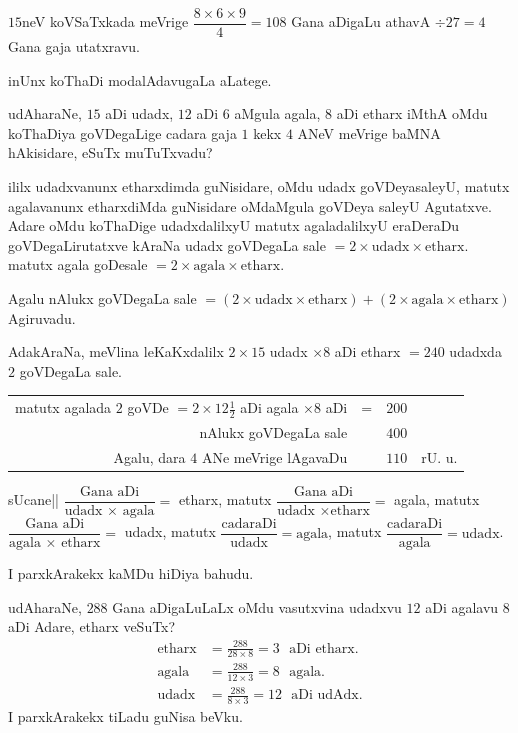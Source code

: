 $15$neV koVSaTxkada meVrige $\dfrac{8\times 6\times 9}{4}=108$ Gana
aDigaLu athavA $\div 27=4$ Gana gaja utatxravu.

inUnx koThaDi modalAdavugaLa aLatege.

udAharaNe, $15$ aDi udadx, $12$ aDi $6$ aMgula agala, $8$ aDi etharx
iMthA oMdu koThaDiya goVDegaLige cadara gaja $1$ kekx $4$ ANeV meVrige
baMNA hAkisidare, eSuTx muTuTxvadu?

ililx udadxvanunx etharxdimda guNisidare, oMdu udadx goVDeyasaleyU,
matutx agalavanunx etharxdiMda guNisidare oMdaMgula goVDeya saleyU
Agutatxve. Adare oMdu koThaDige udadxdalilxyU matutx agaladalilxyU
eraDeraDu goVDegaLirutatxve kAraNa udadx goVDegaLa sale
$=2\times\text{udadx}\times \text{etharx}$. matutx agala goDesale $=2\times
\text{agala}\times \text{etharx}$.

Agalu nAlukx goVDegaLa sale $=(2\times\text{udadx}\times
\text{etharx})+(2\times \text{agala}\times \text{etharx})$ Agiruvadu.

AdakAraNa, meVlina leKaKxdalilx $2\times 15$ udadx $\times 8$ aDi
etharx $=240$ udadxda $2$ goVDegaLa sale.
\begin{center}
\begin{tabular}{rcll}
matutx agalada $2$ goVDe $=2\times 12\frac{1}{2}$ aDi agala $\times 8$
aDi & = & $200$\\
\cline{3-3}
nAlukx goVDegaLa sale & & $400$\\
\cline{3-3}
Agalu, dara $4$ ANe meVrige lAgavaDu && $110$ & rU. u. 
\end{tabular}
\end{center}

sUcane|| $\dfrac{\text{Gana aDi}}{\text{udadx $\times$ agala}}=$
etharx, matutx $\dfrac{\text{Gana aDi}}{\text{udadx $\times$
    etharx}}=$ agala, matutx $\dfrac{\text{Gana aDi}}{\text{agala
    $\times$ etharx}}=$ udadx, matutx
$\dfrac{\text{cadaraDi}}{\text{udadx}}=\text{agala}$, matutx
$\dfrac{\text{cadaraDi}}{\text{agala}}=\text{udadx}$. 

I parxkArakekx kaMDu hiDiya bahudu.

udAharaNe, $288$ Gana aDigaLuLaLx oMdu vasutxvina udadxvu $12$ aDi
agalavu $8$ aDi Adare, etharx veSuTx?
\begin{align*}
\text{etharx} &= \frac{288}{28\times 8}=3\text{~ aDi etharx.}\\[5pt]
\text{agala} &= \frac{288}{12\times 3}=8\text{~ agala}.\\[5pt]
\text{udadx} &= \frac{288}{8\times 3}=12\text{~ aDi udAdx.}
\end{align*}
I parxkArakekx tiLadu guNisa beVku.

